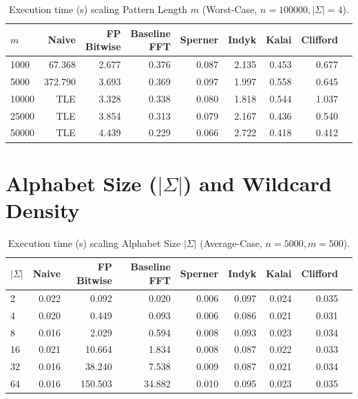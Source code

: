 \begin{table}[H]
\centering
\caption{Execution time (s) scaling Pattern Length $m$ (Worst-Case, $n=100000, |\Sigma|=4$).}
\label{tab:app_worst_m_data}
\begin{tabular}{@{}lrrrrrrrr@{}}
\toprule
$m$ & Naive & FP Bitwise & Baseline FFT & Sperner & Indyk & Kalai & Clifford \\
\midrule
1000  & 67.368 & 2.677 & 0.376 & 0.087 & 2.135 & 0.453 & 0.677 \\
5000  & 372.790 & 3.693 & 0.369 & 0.097 & 1.997 & 0.558 & 0.645 \\
10000 & {\footnotesize TLE}   & 3.328 & 0.338 & 0.080 & 1.818 & 0.544 & 1.037 \\
25000 & {\footnotesize TLE}   & 3.854 & 0.313 & 0.079 & 2.167 & 0.436 & 0.540 \\
50000 & {\footnotesize TLE}   & 4.439 & 0.229 & 0.066 & 2.722 & 0.418 & 0.412 \\
\bottomrule
\end{tabular}
\end{table}

\clearpage
\section{Alphabet Size ($|\Sigma|$) and Wildcard Density}

\begin{table}[H]
\centering
\caption{Execution time (s) scaling Alphabet Size $|\Sigma|$ (Average-Case, $n=5000, m=500$).}
\label{tab:app_mean_sigma_data}
\begin{tabular}{@{}lrrrrrrrr@{}}
\toprule
$|\Sigma|$ & Naive & FP Bitwise & Baseline FFT & Sperner & Indyk & Kalai & Clifford \\
\midrule
2  & 0.022 & 0.092   & 0.020 & 0.006 & 0.097 & 0.024 & 0.035 \\
4  & 0.020 & 0.449   & 0.093 & 0.006 & 0.086 & 0.021 & 0.031 \\
8  & 0.016 & 2.029   & 0.594 & 0.008 & 0.093 & 0.023 & 0.034 \\
16 & 0.021 & 10.664  & 1.834 & 0.008 & 0.087 & 0.022 & 0.033 \\
32 & 0.016 & 38.240  & 7.538 & 0.009 & 0.087 & 0.021 & 0.034 \\
64 & 0.016 & 150.503 & 34.882 & 0.010 & 0.095 & 0.023 & 0.035 \\
\bottomrule
\end{tabular}
\end{table}

